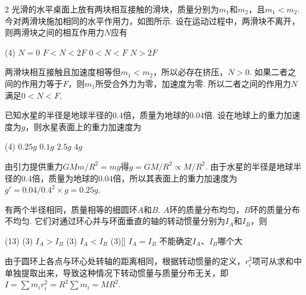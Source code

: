 \begin{problem}
    \begin{paracol}{2}
    光滑的水平桌面上放有两块相互接触的滑块，质量分别为$m_1$和$m_2$，且$m_1<m_2$. 今对两滑块施加相同的水平作用力，如图所示. 设在运动过程中，两滑块不离开，则两滑块之间的相互作用力$N$应有
    \switchcolumn\vspace*{\fill}\centering
    \vspace*{\fill}
\end{paracol}
    \begin{tasks}(4)
        \task $N=0$
        \task $F<N<2F$
        \task[\true] $0<N<F$
        \task $N>2F$
    \end{tasks}
\end{problem}
\begin{solution}
    两滑块相互接触且加速度相等但$m_1<m_2$，所以必存在挤压，$N>0$. 如果二者之间的作用力等于$F$，则$m_1$所受合外力为零，加速度为零. 所以二者之间的作用力$N$满足$0<N<F$.
\end{solution}

\begin{problem}
    已知水星的半径是地球半径的$0.4$倍，质量为地球的$0.04$倍. 设在地球上的重力加速度为$g$，则水星表面上的重力加速度为
\begin{tasks}(4)
\task[\true] $0.25g$
\task $0.1g$
\task $2.5g$
\task $4g$
\end{tasks}
\end{problem}
\begin{solution}
    由引力提供重力$GMm/R^2=mg$得$g=GM/R^2\propto M/R^2$. 由于水星的半径是地球半径的$0.4$倍，质量为地球的$0.04$倍，所以其表面上的重力加速度为$g'=0.04/0.4^2\times g=0.25g$.
\end{solution}

\begin{problem}
    有两个半径相同，质量相等的细圆环$A$和$B$. $A$环的质量分布均匀，$B$环的质量分布不均匀. 它们对通过环心并与环面垂直的轴的转动惯量分别为$I_A$和$I_B$，则
\begin{tasks}(13)
    \task*(3) $I_A>I_B$
    \task*(3) $I_A<I_B$
    \task*(3)[\true] $I_A=I_B$
    \task* 不能确定$I_A$、$I_B$哪个大
\end{tasks}
\end{problem}
\begin{solution}
    由于圆环上各点与环心处转轴的距离相同，根据转动惯量的定义，$r_i^2$项可从求和中单独提取出来，导致这种情况下转动惯量与质量分布无关，即$I=\sum{m_ir_i^2}=R^2\sum{m_i}=MR^2$.
\end{solution}

